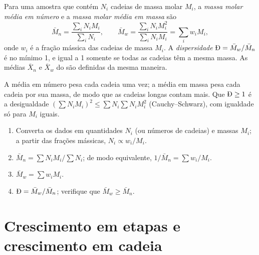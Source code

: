 \begin{definition}\label{def:b2:polymer-synthesis:averages}
Para uma amostra que contém $N_i$ cadeias de massa molar $M_i$, a \emph{massa molar média em
número} e a \emph{massa molar média em massa}
são
\begin{equation*}
\bar M_n = \frac{\sum_i N_i M_i}{\sum_i N_i}, \qquad
\bar M_w = \frac{\sum_i N_i M_i^2}{\sum_i N_i M_i} = \sum_i w_i M_i,
\end{equation*}
onde $w_i$ é a fração mássica das cadeias de massa $M_i$. A \emph{dispersidade}
$\text{\DH} = \bar M_w/\bar M_n$ é no mínimo 1, e igual a 1 somente se todas as cadeias têm a mesma
massa. As médias $\bar X_n$ e $\bar X_w$ do  são definidas da mesma
maneira.
\end{definition}

A média em número pesa cada cadeia uma vez; a média em massa pesa cada cadeia por sua massa, de modo que
as cadeias longas contam mais. Que $\text{\DH} \ge 1$ é a desigualdade $\left(\sum N_i M_i\right)^2 \le
\sum N_i \sum N_i M_i^2$ (Cauchy--Schwarz), com igualdade só para $M_i$ iguais.

\begin{method}\label{met:b2:polymer-synthesis:averages}
\begin{enumerate}
  \item Converta os dados em quantidades $N_i$ (ou números de cadeias) e massas $M_i$; a partir das
        frações mássicas, $N_i \propto w_i/M_i$.
  \item $\bar M_n = \sum N_i M_i / \sum N_i$; de modo equivalente, $1/\bar M_n = \sum w_i/M_i$.
  \item $\bar M_w = \sum w_i M_i$.
  \item $\text{\DH} = \bar M_w/\bar M_n$; verifique que $\bar M_w \ge \bar M_n$.
\end{enumerate}
\end{method}

\section{Crescimento em etapas e crescimento em cadeia}

